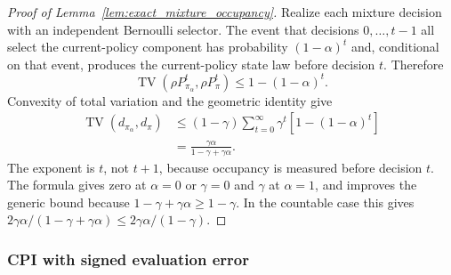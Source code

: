 \documentclass{article}
\theoremstyle{plain}
\theoremstyle{definition}
\theoremstyle{remark}
\begin{document}
\begin{proof}[Proof of Lemma~\ref{lem:exact_mixture_occupancy}]
Realize each mixture decision with an independent Bernoulli selector. The
event that decisions $0,\ldots,t-1$ all select the current-policy component
has probability $(1-\alpha)^t$ and, conditional on that event, produces the
current-policy state law before decision $t$. Therefore
\[
\operatorname{TV}(\rho P_{\pi_\alpha}^t,\rho P_\pi^t)
\le1-(1-\alpha)^t.
\]
Convexity of total variation and the geometric identity give
\begin{align*}
\operatorname{TV}(d_{\pi_\alpha},d_\pi)
&\le(1-\gamma)\sum_{t=0}^\infty
\gamma^t[1-(1-\alpha)^t]\\
&=\frac{\gamma\alpha}{1-\gamma+\gamma\alpha}.
\end{align*}
The exponent is $t$, not $t+1$, because occupancy is measured before
decision $t$. The formula gives zero at $\alpha=0$ or $\gamma=0$ and
$\gamma$ at $\alpha=1$, and improves the generic bound because
$1-\gamma+\gamma\alpha\ge1-\gamma$. In the countable case this gives
$2\gamma\alpha/(1-\gamma+\gamma\alpha)
\le2\gamma\alpha/(1-\gamma)$.
\end{proof}


\subsubsection{CPI with signed evaluation error}
\label{app:cpi_derivation}
\end{document}
